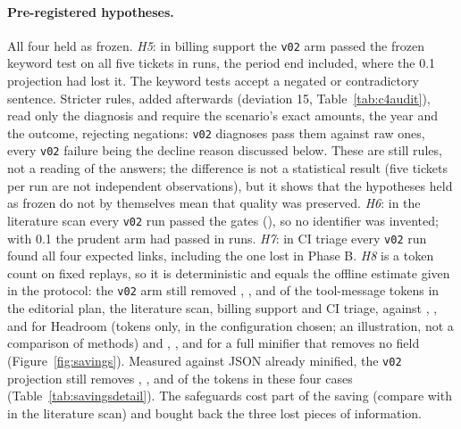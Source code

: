\paragraph{Pre-registered hypotheses.} All four held as frozen. \emph{H5}: in billing support the \texttt{v02} arm
passed the frozen keyword test on all five tickets in \StudyTwoFrozenAllRightVtwo{} runs, the period end included,
where the 0.1 projection had lost it. The keyword tests accept a negated or contradictory sentence. Stricter
rules, added afterwards (deviation 15, Table~\ref{tab:c4audit}), read only the diagnosis and require the scenario's
exact amounts, the year and the outcome, rejecting negations: \AuditCFourDVtwo{} \texttt{v02} diagnoses pass them
against \AuditCFourDRaw{} raw ones, every \texttt{v02} failure being the decline reason discussed below. These are
still rules, not a reading of the answers; the difference is not a statistical result (five tickets per run are not
independent observations), but it shows that the hypotheses held as frozen do not by themselves mean that quality was
preserved. \emph{H6}: in the literature scan every \texttt{v02} run passed the gates
(\StudyTwoVtwoGatesiii), so no identifier was invented; with 0.1 the prudent arm had passed in
\PhaseBPrudentGatesiii{} runs. \emph{H7}: in CI triage every \texttt{v02} run found all four expected links,
including the one lost in Phase B. \emph{H8} is a token count on fixed replays, so it is
deterministic and equals the offline estimate given in the protocol: the \texttt{v02} arm still removed \StudyTwoVtwoTokensi,
\StudyTwoVtwoTokensiii, \StudyTwoVtwoTokensiv{} and \StudyTwoVtwoTokensv{} of the tool-message tokens in the
editorial plan, the literature scan, billing support and CI triage, against \StudyTwoHeadroomTokensi, \StudyTwoHeadroomTokensiii, \StudyTwoHeadroomTokensiv{} and
\StudyTwoHeadroomTokensv{} for Headroom (tokens only, in the configuration chosen; an illustration, not a comparison of methods) and
\ReserialMinReplayi, \ReserialMinReplayiii, \ReserialMinReplayiv{} and
\ReserialMinReplayv{} for a full minifier that removes no field (Figure~\ref{fig:savings}). Measured against JSON
already minified, the \texttt{v02} projection still removes \VtwoVsMini, \VtwoVsMiniii, \VtwoVsMiniv{} and
\VtwoVsMinv{} of the tokens in these four cases (Table~\ref{tab:savingsdetail}). The safeguards cost part of the saving (compare
\PhaseBPrudentTokensiii{} with \StudyTwoVtwoTokensiii{} in the literature scan) and bought back the three lost
pieces of information.


